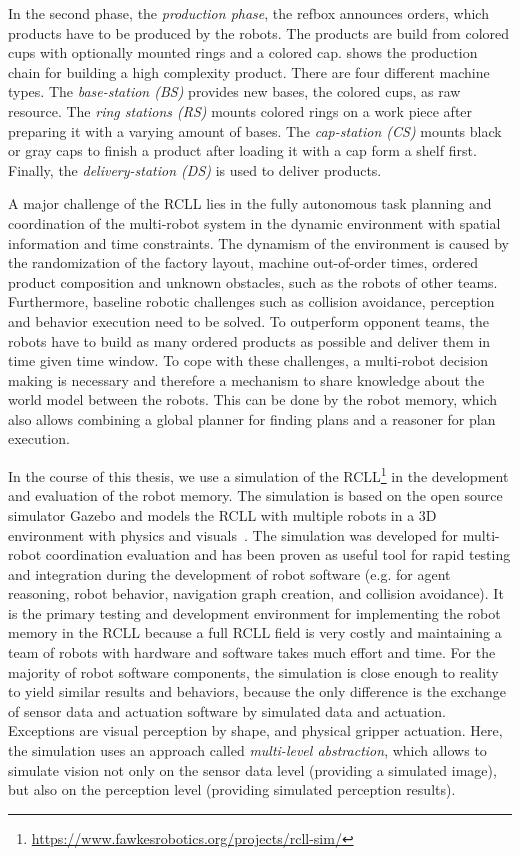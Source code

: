 In the second phase, the \emph{production phase}, the refbox announces
orders, which products have to be produced by the robots. The products
are build from colored cups with optionally mounted rings and a
colored cap.   shows the production chain for
building a high complexity product.  There are four different machine
types. The \emph{base-station (BS)} provides new bases, the colored
cups, as raw resource. The \emph{ring stations (RS)} mounts colored
rings on a work piece after preparing it with a varying amount of
bases.  The \emph{cap-station (CS)} mounts black or gray caps to
finish a product after loading it with a cap form a shelf first.
Finally, the \emph{delivery-station (DS)} is used to deliver products.

A major challenge of the RCLL lies in the fully autonomous task
planning and coordination of the multi-robot system in the dynamic
environment with spatial information and time constraints. The
dynamism of the environment is caused by the randomization of the factory
layout, machine out-of-order times, ordered product composition and
unknown obstacles, such as the robots of other teams. Furthermore,
baseline robotic challenges such as collision avoidance, perception
and behavior execution need to be solved. To outperform opponent
teams, the robots have to build as many ordered products as possible
and deliver them in time given time window.  To cope with these
challenges, a multi-robot decision making is necessary and therefore a
mechanism to share knowledge about the world model between the
robots. This can be done by the robot memory, which also allows
combining a global planner for finding plans and a reasoner for plan
execution.

In the course of this thesis, we use a simulation of the
RCLL\footnote{\url{https://www.fawkesrobotics.org/projects/rcll-sim/}}
in the development and evaluation of the robot memory. The simulation
is based on the open source simulator Gazebo and models the RCLL with
multiple robots in a 3D environment with physics and
visuals~\cite{Gazebo-Design,Gazsim-Thesis,LLSF-Sim}. The simulation
was developed for multi-robot coordination evaluation and has
been proven as useful tool for rapid testing and integration during
the development of robot software (e.g. for agent reasoning, robot
behavior, navigation graph creation, and collision avoidance). It is
the primary testing and development environment for implementing the
robot memory in the RCLL because a full RCLL field is very costly and
maintaining a team of robots with hardware and software takes much
effort and time. For the majority of robot software components, the
simulation is close enough to reality to yield similar results and
behaviors, because the only difference is the exchange of sensor data
and actuation software by simulated data and actuation. Exceptions are
visual perception by shape, and physical gripper actuation. Here, the
simulation uses an approach called \emph{multi-level abstraction},
which allows to simulate vision not only on the sensor data level
(providing a simulated image), but also on the perception level
(providing simulated perception results).

